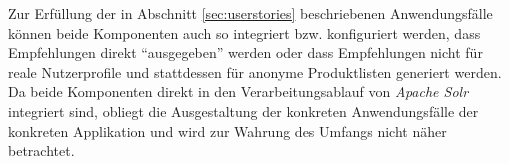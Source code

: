 Zur Erfüllung der in Abschnitt \ref{sec:userstories} beschriebenen Anwendungsfälle können beide Komponenten auch so integriert bzw. konfiguriert werden, dass Empfehlungen direkt ``ausgegeben'' werden oder dass Empfehlungen nicht für reale Nutzerprofile und stattdessen für anonyme Produktlisten generiert werden. Da beide Komponenten direkt in den Verarbeitungsablauf von \textit{Apache Solr} integriert sind, obliegt die Ausgestaltung der konkreten Anwendungsfälle der konkreten Applikation und wird zur Wahrung des Umfangs nicht näher betrachtet.

